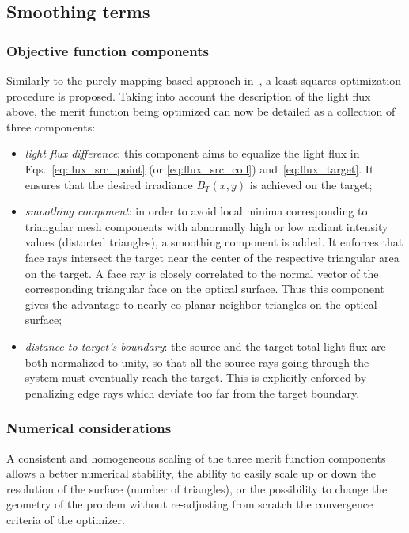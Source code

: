 \subsection{Smoothing terms}

\subsubsection{Objective function components}
Similarly to the purely mapping-based approach in~\cite{Baeuerle2012},
a least-squares optimization procedure is proposed. Taking into
account the description of the light flux above, the merit function
being optimized can now be detailed as a collection of three
components:

\begin{itemize}
\item{\emph{light flux difference}}: this component aims to equalize
  the light flux in Eqs.~\eqref{eq:flux_src_point} (or
  \eqref{eq:flux_src_coll}) and~\eqref{eq:flux_target}. It ensures
  that the desired irradiance $B_T(x, y)$ is achieved on the target;
\item{\emph{smoothing component}}: in order to avoid local minima
  corresponding to triangular mesh components with abnormally high or
  low radiant intensity values (distorted triangles), a smoothing component is
  added. It enforces that face rays intersect the target near the
  center of the respective triangular area on the target. 
  A face ray is closely correlated to the normal vector of the 
  corresponding triangular face on the optical surface. Thus this 
  component gives the advantage to nearly co-planar neighbor triangles 
  on the optical surface;
\item{\emph{distance to target's boundary}}: the source and the target
  total light flux are both normalized to unity, so that all the
  source rays going through the system must eventually reach the
  target. This is explicitly enforced by penalizing edge rays which
  deviate too far from the target boundary.
\end{itemize}

\subsubsection{Numerical considerations}
A consistent and homogeneous scaling of the three merit function
components allows a better numerical stability, the ability to easily
scale up or down the resolution of the surface (number of triangles),
or the possibility to change the geometry of the problem without
re-adjusting from scratch the convergence criteria of the optimizer.

